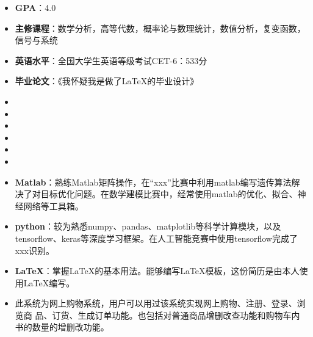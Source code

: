 \documentclass{resumeclass}
\begin{document}
\resumehead


\begin{itemize}[topsep=0pt]
	\item \textbf{GPA}：4.0
	\item \textbf{主修课程}：数学分析，高等代数，概率论与数理统计，数值分析，复变函数，信号与系统
	\item \textbf{英语水平}：全国大学生英语等级考试CET-6：533分
	\item \textbf{毕业论文}：《我怀疑我是做了\LaTeX 的毕业设计》
\end{itemize}


\begin{itemize}[leftmargin=*]
	\item {}
	\item {}
	\item {}
	\item {}
	\item {}
	\item {}
\end{itemize}

\begin{itemize}[leftmargin=*]
	\item \textbf{Matlab}：熟练Matlab矩阵操作，在“xxx”比赛中利用matlab编写遗传算法解决了对目标优化问题。在数学建模比赛中，经常使用matlab的优化、拟合、神经网络等工具箱。
	\item \textbf{python}：较为熟悉numpy、pandas、matplotlib等科学计算模块，以及tensorflow、keras等深度学习框架。在人工智能竞赛中使用tensorflow完成了xxx识别。
	\item \textbf{\LaTeX}：掌握\LaTeX 的基本用法。能够编写\LaTeX 模板，这份简历是由本人使用\LaTeX 编写。
\end{itemize}



\begin{itemize}[leftmargin=*]
	\item 此系统为网上购物系统，用户可以用过该系统实现网上购物、注册、登录、浏览商
	品、订货、生成订单功能。也包括对普通商品增删改查功能和购物车内书的数量的增删改功能。
\end{itemize}
\end{document}
